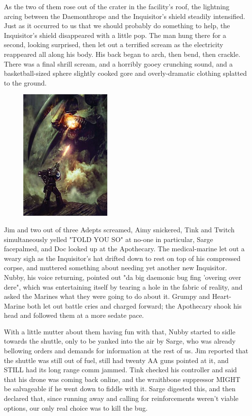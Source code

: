 As the two of them rose out of the crater in the facility's roof, the lightning arcing between the Daemonthrope and the Inquisitor's shield steadily intensified. 
Just as it occurred to us that we should probably do something to help, the Inquisitor's shield disappeared with a  little pop. 
The man hung there for a second, looking surprised, then let out a terrified scream as the electricity reappeared all along his body. 
His back began to arch, then bend, then crackle. 
There was a final shrill scream, and a horribly gooey crunching sound, and a basketball-sized sphere slightly cooked gore and overly-dramatic clothing splatted to the ground.

\begin{figure}
	\begin{center}
		\includegraphics[width=\figwidth]{pics/16/18.png}
	\end{center}
\end{figure}
Jim and two out of three Adepts screamed, Aimy snickered, Tink and Twitch simultaneously yelled "TOLD YOU SO" at no-one in particular, Sarge facepalmed, and Doc looked up at the Apothecary. 
The medical-marine let out a weary sigh as the Inquisitor's hat drifted down to rest on top of his compressed corpse, and muttered something about needing yet another new Inquisitor. 
Nubby, his voice returning, pointed out "da big daemonic bug fing 'overing over dere", which was entertaining itself by tearing a hole in the fabric of reality, and asked the Marines what they were going to do about it. 
Grumpy and Heart-Marine both let out battle cries and charged forward; 
the Apothecary shook his head and followed them at a more sedate pace.

With a little mutter about them having fun with that, Nubby started to sidle towards the shuttle, only to be yanked into the air by Sarge, who was already bellowing orders and demands for information at the rest of us. 
Jim reported that the shuttle was still out of fuel, still had twenty AA guns pointed at it, and STILL had its long range comm jammed. 
Tink checked his controller and said that his drone was coming back online, and the wraithbone suppressor MIGHT be salvageable if he went down to fiddle with it. 
Sarge digested this, and then declared that, since running away and calling for reinforcements weren't viable options, our only real choice was to kill the bug.

